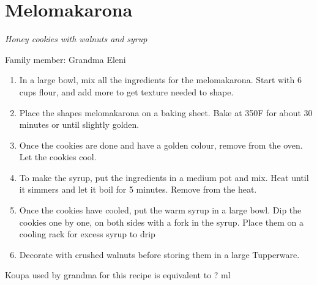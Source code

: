 \chapter{Melomakarona}
\label{ch:melomakarona}


\textit{Honey cookies with walnuts and syrup}

Family member: Grandma Eleni

\begin{enumerate}
    \item In a large bowl, mix all the ingredients for the melomakarona. Start with 6 cups flour, and add more to get texture needed to shape.
    \item Place the shapes melomakarona on a baking sheet. Bake at 350\degree F for about 30 minutes or until slightly golden.
    \item Once the cookies are done and have a golden colour, remove from the oven. Let the cookies cool. 
    \item To make the syrup, put the ingredients in a medium pot and mix. Heat until it simmers and let it boil for 5 minutes. Remove from the heat.
    \item Once the cookies have cooled, put the warm syrup in a large bowl. Dip the cookies one by one, on both sides with a fork in the syrup. Place them on a cooling rack for excess syrup to drip
    \item Decorate with crushed walnuts before storing them in a large Tupperware.
\end{enumerate}

Koupa used by grandma for this recipe is equivalent to ? ml
